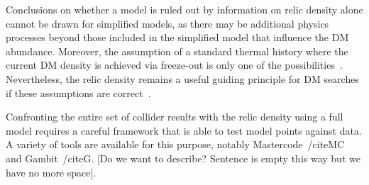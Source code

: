 Conclusions on whether a model is ruled out by information on relic density alone cannot be drawn for simplified models, 
as there may be additional physics processes beyond those included in the simplified model that influence the DM abundance.
Moreover, the assumption of a standard thermal history where the current DM density is achieved via freeze-out  
is only one of the possibilities~\cite{Bernal:2017kxu}. 
Nevertheless, the relic density remains a useful guiding principle for DM searches if these assumptions are correct~\cite{Busoni:2014gta,Catena:2017xqq}. 

Confronting the entire set of collider results with the relic density using a full model requires a 
careful framework that is able to test model points against data. A variety of tools are available for this purpose,
notably Mastercode~/cite{MC} and Gambit~/cite{G}. [Do we want to describe? Sentence is empty this way but we have no more space]. 



